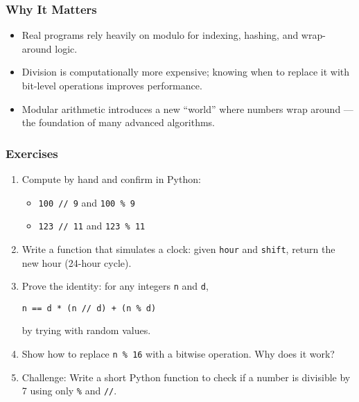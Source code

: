 \documentclass[
  letterpaper,
  DIV=11,
  numbers=noendperiod]{scrreprt}
\providecommand{\tightlist}{%
  \setlength{\itemsep}{0pt}\setlength{\parskip}{0pt}}
\begin{document}
\subsubsection{Why It Matters}\label{why-it-matters-4}

\begin{itemize}
\tightlist
\item
  Real programs rely heavily on modulo for indexing, hashing, and
  wrap-around logic.
\item
  Division is computationally more expensive; knowing when to replace it
  with bit-level operations improves performance.
\item
  Modular arithmetic introduces a new ``world'' where numbers wrap
  around --- the foundation of many advanced algorithms.
\end{itemize}

\subsubsection{Exercises}\label{exercises-4}

\begin{enumerate}
\def\labelenumi{\arabic{enumi}.}
\item
  Compute by hand and confirm in Python:

  \begin{itemize}
  \tightlist
  \item
    \texttt{100\ //\ 9} and \texttt{100\ \%\ 9}
  \item
    \texttt{123\ //\ 11} and \texttt{123\ \%\ 11}
  \end{itemize}
\item
  Write a function that simulates a clock: given \texttt{hour} and
  \texttt{shift}, return the new hour (24-hour cycle).
\item
  Prove the identity: for any integers \texttt{n} and \texttt{d},

\begin{verbatim}
n == d * (n // d) + (n % d)
\end{verbatim}

  by trying with random values.
\item
  Show how to replace \texttt{n\ \%\ 16} with a bitwise operation. Why
  does it work?
\item
  Challenge: Write a short Python function to check if a number is
  divisible by 7 using only \texttt{\%} and \texttt{//}.
\end{enumerate}
\end{document}
